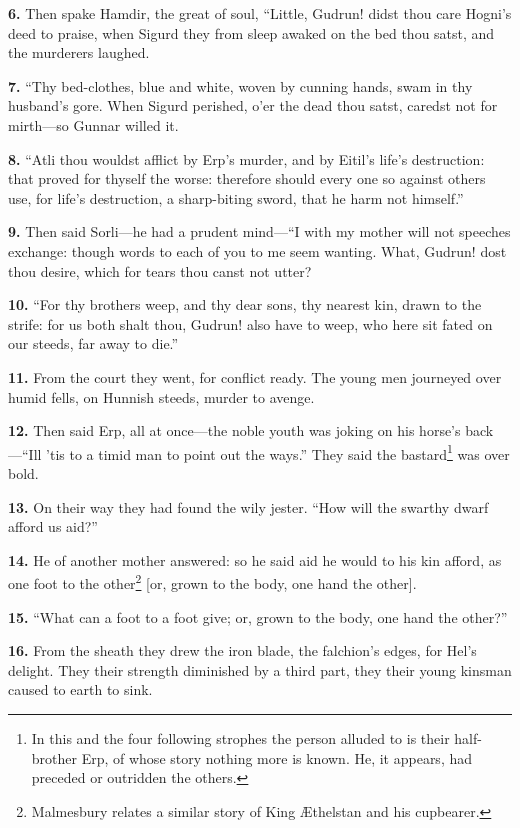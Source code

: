 \textbf{6.} Then spake Hamdir, the great of soul, ``Little, Gudrun! didst thou
care Hogni's deed to praise, when Sigurd they from sleep awaked on the
bed thou satst, and the murderers laughed.

\textbf{7.} ``Thy bed-clothes, blue and white, woven by cunning hands, swam in
thy husband's gore. When Sigurd perished, o'er the dead thou satst,
caredst not for mirth—so Gunnar willed it.

\textbf{8.} ``Atli thou wouldst afflict by Erp's murder, and by Eitil's life's
destruction: that proved for thyself the worse: therefore should every
one so against others use, for life's destruction, a sharp-biting
sword, that he harm not himself.''

\textbf{9.} Then said Sorli—he had a prudent mind—``I with my mother will
not speeches exchange: though words to each of you to me seem wanting.
What, Gudrun! dost thou desire, which for tears thou canst not utter?

\textbf{10.} ``For thy brothers weep, and thy dear sons, thy nearest kin,
drawn to the strife: for us both shalt thou, Gudrun! also have to
weep, who here sit fated on our steeds, far away to die.''

\textbf{11.} From the court they went, for conflict ready. The young men
journeyed over humid fells, on Hunnish steeds, murder to avenge.

\textbf{12.} Then said Erp, all at once—the noble youth was joking on his
horse's back—``Ill 'tis to a timid man to point out the ways.'' They
said the bastard\footnote{In this and the four following strophes the person
alluded to is their half-brother Erp, of whose story nothing more is
known. He, it appears, had preceded or outridden the others.} was over bold.

\textbf{13.} On their way they had found the wily jester. ``How will the
swarthy dwarf afford us aid?''

\textbf{14.} He of another mother answered: so he said aid he would to his
kin afford, as one foot to the other\footnote{Malmesbury relates a similar story of King Æthelstan
and his cupbearer.} [or, grown to the body, one
hand the other].

\textbf{15.} ``What can a foot to a foot give; or, grown to the body, one hand
the other?''

\textbf{16.} From the sheath they drew the iron blade, the falchion's edges,
for Hel's delight. They their strength diminished by a third part,
they their young kinsman caused to earth to sink.


